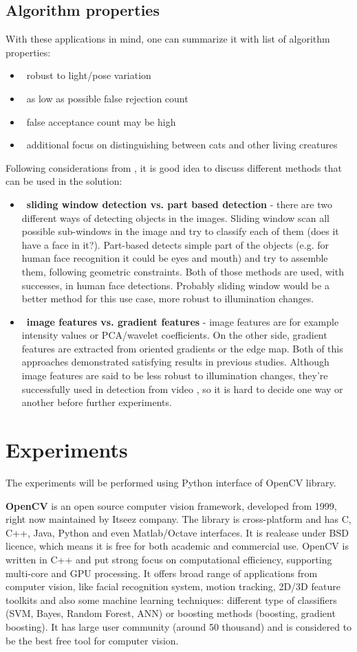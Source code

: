\documentclass[hyperref]{acmtrans2e}
\begin{document}
\subsection{Algorithm properties}
With these applications in mind, one can summarize it with list of algorithm properties:
\begin{itemize}
\item~robust to light/pose variation 
\item~as low as possible false rejection count
\item~false acceptance count may be high
\item~additional focus on distinguishing between cats and other living creatures
\end{itemize}
Following considerations from \cite{shape:2008}, it is good idea to discuss different methods that can be used in the solution:
\begin{itemize}
\item ~\textbf{sliding window detection vs. part based detection} - there are two different ways of detecting objects in the images. Sliding window scan all possible sub-windows in the image and try to classify each of them (does it have a face in it?). Part-based detects simple part of the objects (e.g. for human face recognition it could be eyes and mouth) and try to assemble them, following geometric constraints. Both of those methods are used, with successes, in human face detections. Probably sliding window would be a better method for this use case, more robust to illumination changes.
\item ~\textbf{image features vs. gradient features} - image features are for example intensity values or PCA/wavelet coefficients. On the other side, gradient features are extracted from oriented gradients or the edge map. Both of this approaches demonstrated satisfying results in previous studies. Although image features are said to be less robust to illumination changes, they're successfully used in detection from video \cite{lions:2006}, so it is hard to decide one way or another before further experiments.
\end{itemize}
\section{Experiments}
The experiments will be performed using Python interface of OpenCV library.

\textbf{OpenCV} \cite{cv:2015} is an open source computer vision framework, developed from 1999, right now maintained by Itseez company. The library is cross-platform and has C, C++, Java, Python and even Matlab/Octave interfaces. It is realease under BSD licence, which means it is free for both academic and commercial use. OpenCV is written in C++ and put strong focus on computational efficiency, supporting multi-core and GPU processing. It offers broad range of applications from computer vision, like facial recognition system, motion tracking, 2D/3D feature toolkits and also some machine learning techniques: different type of classifiers (SVM, Bayes, Random Forest, ANN) or boosting methods (boosting, gradient boosting). It has large user community (around 50 thousand) and is considered to be the best free tool for computer vision. 
\end{document}

